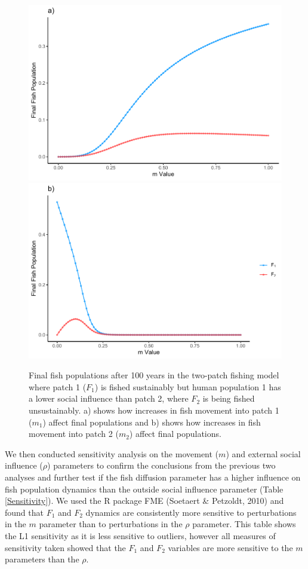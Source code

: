 \documentclass[
  12pt,
]{article}
\begin{document}
\begin{figure}
\includegraphics[width=0.5\linewidth]{Wulfing_Thesis_files/figure-latex/mExploreGraph-1} \includegraphics[width=0.5\linewidth]{Wulfing_Thesis_files/figure-latex/mExploreGraph-2} \caption{Final fish populations after 100 years in the two-patch fishing model where patch 1 (\(F_1\)) is fished sustainably but human population 1 has a lower social influence than patch 2, where \(F_2\) is being fished unsustainably. a) shows how increases in fish movement into patch 1 (\(m_1\)) affect final populations and b) shows how increases in fish movement into patch 2 (\(m_2\)) affect final populations. \label{mExploreGraph}}\label{fig:mExploreGraph}
\end{figure}

We then conducted sensitivity analysis on the movement (\(m\)) and external social influence (\(\rho\)) parameters to confirm the conclusions from the previous two analyses and further test if the fish diffusion parameter has a higher influence on fish population dynamics than the outside social influence parameter (Table \ref{Sensitivity}). We used the R package FME (Soetaert \& Petzoldt, 2010) and found that \(F_1\) and \(F_2\) dynamics are consistently more sensitive to perturbations in the \(m\) parameter than to perturbations in the \(\rho\) parameter. This table shows the L1 sensitivity as it is less sensitive to outliers, however all measures of sensitivity taken showed that the \(F_1\) and \(F_2\) variables are more sensitive to the \(m\) parameters than the \(\rho\).
\end{document}
